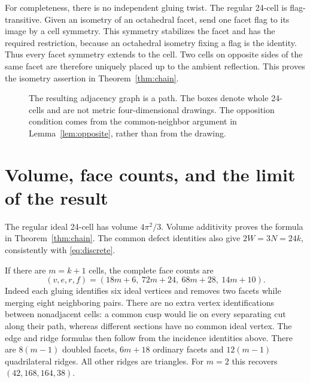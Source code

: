 \documentclass[11pt]{article}
\theoremstyle{remark}
\newcommand{\CELL}{\mathcal C}
\begin{document}
For completeness, there is no independent gluing twist. The
regular 24-cell is flag-transitive. Given an isometry of an
octahedral facet, send one facet flag to its image by a cell
symmetry. This symmetry stabilizes the facet and has the required
restriction, because an octahedral isometry fixing a flag is the
identity. Thus every facet symmetry extends to the cell.
Two cells on opposite sides of the same facet are therefore
uniquely placed up to the ambient reflection. This proves the
isometry assertion in Theorem~\ref{thm:chain}.

\begin{figure}[htbp]
\centering
{}
\caption{The resulting adjacency graph is a path. The boxes denote
whole 24-cells and are not metric four-dimensional drawings. The
opposition condition comes from the common-neighbor argument in
Lemma~\ref{lem:opposite}, rather than from the drawing.}
\label{fig:chain}
\end{figure}

\section{Volume, face counts, and the limit of the result}

The regular ideal 24-cell has volume $4\pi^2/3$.
Volume additivity proves the formula in Theorem~\ref{thm:chain}. The common defect identities also give
$2W=3N=24k$, consistently with \eqref{eq:discrete}.

If there are $m=k+1$ cells, the complete face counts are
\[
 (v,e,r,f)=(18m+6,\ 72m+24,\ 68m+28,\ 14m+10).
\]
Indeed each gluing identifies six ideal vertices and removes two
facets while merging eight neighboring pairs. There are no extra
vertex identifications between nonadjacent cells: a common cusp
would lie on every separating cut along their path, whereas
different sections have no common ideal vertex. The edge and
ridge formulas then follow from the incidence identities above.
There are $8(m-1)$ doubled facets, $6m+18$ ordinary facets and
$12(m-1)$ quadrilateral ridges. All other ridges are triangles.
For $m=2$ this recovers $(42,168,164,38)$.
\end{document}
